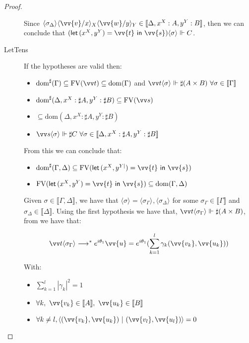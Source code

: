 \documentclass[runningheads,orivec,envcountsame,envcountsect]{llncs}
\newcommand\lra{\longrightarrow}
\newcommand\ansubst[2]{\ensuremath{\langle #1 \rangle_{#2}}}
\newcommand\dom[1]{\mathrm{dom}(#1)}
\newcommand\sdom[1]{\mathrm{dom}^{\sharp}(#1)}
\newcommand\FV[1]{\mathrm{FV}(#1)}
\def\scal#1#2{\langle{#1}~|~{#2}\rangle}
\def\Pair#1#2{(#1,#2)} %
\def\letkeyword{\mathsf{let}}
\def\inkeyword{\mathsf{in}}
\def\LetP#1#2#3#4#5#6{\letkeyword\,\Pair{#1^{#2}}{#3^{#4}}=#5~\inkeyword~#6}
\def\eval{\lra^*}
\def\sem#1{\llbracket#1\rrbracket}
\def\real{\Vdash}
\begin{document}
\begin{proof}
\begin{description}
    Since $\ansubst{\sigma_\Delta}{}\ansubst{\vv{v}/x}{X}\ansubst{\vv{w}/y}{Y}\in\sem{\Delta,{x}^{X}:A,{y}^Y:B}$, then we can conclude that $(\LetP{x}{X}{y}{Y}{\vv{t}}{\vv{s}})\ansubst{\sigma}{}\real C$.

    \item[LetTens] If the hypotheses are valid then:
    \begin{itemize}
        \item $\sdom{\Gamma}\subseteq \FV{\vv t} \subseteq \dom{\Gamma}$ and $\vv t \ansubst{\sigma}{}\Vdash \sharp(A\times B)\ \forall \sigma\in\sem\Gamma$
        \item $\sdom{\Delta, {x}^{X}:\sharp A, {y}^{Y}:\sharp B}\subseteq \FV{\vv s}$
        \item $\subseteq \dom{\Delta, {x}^{X}:\sharp A, {y}^{Y}:\sharp B}$
        \item $\vv s \ansubst{\sigma}{}\Vdash \sharp C\ \forall \sigma\in\sem{\Delta, {x}^{X}:\sharp A, {y}^{Y}:\sharp B}$
    \end{itemize}
    
    From this we can conclude that:
    \begin{itemize}
        \item $\sdom{\Gamma,\Delta}\subseteq\FV{\LetP{x}{X}{y}{Y|}{\vv{t}}{\vv{s}}}$
        \item $\FV{\LetP{x}{X}{y}{Y}{\vv{t}}{\vv{s}}}\subseteq\dom{\Gamma,\Delta}$
    \end{itemize}
    
    Given $\sigma\in\sem{\Gamma,\Delta}$, we have that $\ansubst{\sigma}{}=\ansubst{\sigma_\Gamma}{},\ansubst{\sigma_\Delta}{}$ for some $\sigma_\Gamma\in\sem\Gamma$ and $\sigma_\Delta\in\sem\Delta$. Using the first hypothesis we have that, $\vv t\ansubst{\sigma_\Gamma}{}\real \sharp(A\times B)$, from  we have that:
    
    \[\vv t\ansubst{\sigma_\Gamma}{}\eval e^{i\theta_1}\vv{u}=e^{i\theta_1}(\sum_{k=1}^{l} \gamma_k \Pair{\vv{v_k}}{\vv{u_k}})\] 
    
    With:
    \begin{itemize}
        \item $\sum_{k=1}^{l} |\gamma_k|^2 = 1$
        \item $\forall k,\ \vv{v_k}\in\sem{A},\ \vv{u_k}\in\sem{B}$
        \item $\forall k\neq l, \scal{\Pair{\vv{v_k}}{\vv{u_k}}}{\Pair{\vv{v_l}}{\vv{u_l}}}= 0$
    \end{itemize}
    

\end{description}
\end{proof}
\end{document}
